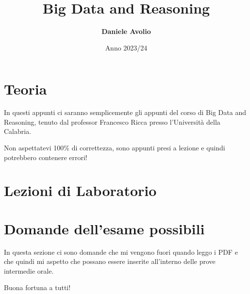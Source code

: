 \documentclass{article}
\title{\color{custompurple}\Huge Big Data and Reasoning}
\author{\textbf{Daniele Avolio}}
\date{Anno 2023/24}
\begin{document}
\maketitle
\newpage

\tableofcontents

\newpage
\section{Teoria}
In questi appunti ci saranno semplicemente gli appunti del corso di Big Data and Reasoning, tenuto dal professor Francesco Ricca presso l'Università della Calabria.

Non aspettatevi 100\% di correttezza, sono appunti presi a lezione e quindi potrebbero contenere errori!


\newpage

\newpage
\section{Lezioni di Laboratorio}

\newpage

\section*{Domande dell'esame possibili}
In questa sezione ci sono domande che mi vengono fuori quando 
leggo i PDF e che quindi mi aspetto che possano essere 
inserite all'interno delle prove intermedie \/ orale.

Buona fortuna a tutti!

\newpage






\end{document}
